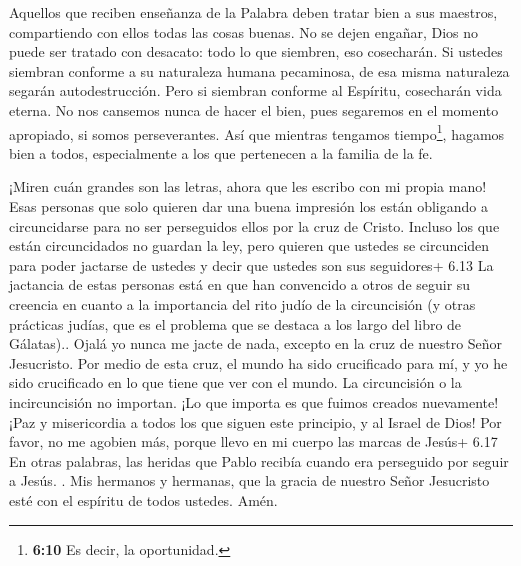  Aquellos que reciben enseñanza de la Palabra deben tratar
bien a sus maestros, compartiendo con ellos todas las cosas buenas.
 No se dejen engañar, Dios no puede ser tratado con
desacato: todo lo que siembren, eso cosecharán.  Si ustedes
siembran conforme a su naturaleza humana pecaminosa, de esa misma
naturaleza segarán autodestrucción. Pero si siembran conforme al
Espíritu, cosecharán vida eterna.  No nos cansemos nunca de
hacer el bien, pues segaremos en el momento apropiado, si somos
perseverantes.  Así que mientras tengamos
tiempo\footnote{\textbf{6:10} Es decir, la oportunidad.}, hagamos bien a
todos, especialmente a los que pertenecen a la familia de la fe.

 ¡Miren cuán grandes son las letras, ahora que les escribo
con mi propia mano!  Esas personas que solo quieren dar una
buena impresión los están obligando a circuncidarse para no ser
perseguidos ellos por la cruz de Cristo.  Incluso los que
están circuncidados no guardan la ley, pero quieren que ustedes se
circunciden para poder jactarse de ustedes y decir que ustedes son sus
seguidores+ 6.13 La jactancia de estas personas está en que han
convencido a otros de seguir su creencia en cuanto a la importancia del
rito judío de la circuncisión (y otras prácticas judías, que es el
problema que se destaca a los largo del libro de Gálatas)..
 Ojalá yo nunca me jacte de nada, excepto en la cruz de
nuestro Señor Jesucristo. Por medio de esta cruz, el mundo ha sido
crucificado para mí, y yo he sido crucificado en lo que tiene que ver
con el mundo.  La circuncisión o la incircuncisión no
importan. ¡Lo que importa es que fuimos creados nuevamente!
 ¡Paz y misericordia a todos los que siguen este principio,
y al Israel de Dios!  Por favor, no me agobien más, porque
llevo en mi cuerpo las marcas de Jesús+ 6.17 En otras palabras, las
heridas que Pablo recibía cuando era perseguido por seguir a Jesús. .
 Mis hermanos y hermanas, que la gracia de nuestro Señor
Jesucristo esté con el espíritu de todos ustedes. Amén.
